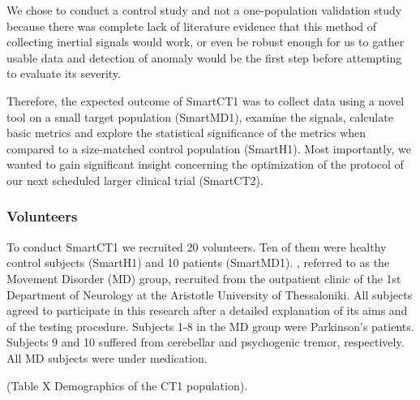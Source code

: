 We chose to conduct a control study and not a one-population validation study because there was complete lack of literature evidence that this method of collecting inertial signals would work, or even be robust enough for us to gather usable data and detection of anomaly would be the first step before attempting to evaluate its severity. 

Therefore, the expected outcome of \gls{SmartCT1} was to collect data using a novel tool on a small target population (\gls{SmartMD1}), examine the signals, calculate basic metrics and explore the statistical significance of the metrics when compared to a size-matched control population (\gls{SmartH1}). Most importantly, we wanted to gain significant insight concerning the optimization of the protocol of our next scheduled larger clinical trial (\gls{SmartCT2}).

\subsubsection{Volunteers}
\label{subsubsec:smartCT1Volunteers}
To conduct \gls{SmartCT1} we recruited 20 volunteers. Ten of them were healthy control subjects (\gls{SmartH1}) and 10 patients (\gls{SmartMD1}). , referred to as the Movement Disorder (MD) group, recruited from the outpatient clinic of the 1st Department of Neurology at the Aristotle University of Thessaloniki. All subjects agreed to participate in this research after a detailed explanation of its aims and of the testing procedure. Subjects 1-8 in the MD group were Parkinson’s patients. Subjects 9 and 10 suffered from cerebellar and psychogenic tremor, respectively. All MD subjects were under medication.  

(\textcolor{BurntOrange}{Table X Demographics of the CT1 population}).

